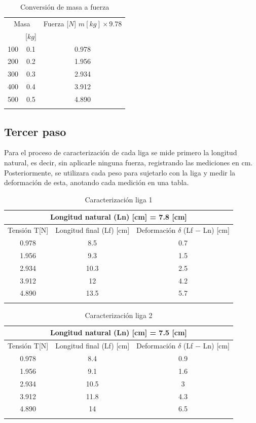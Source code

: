 \documentclass[12pt, titlepage]{report}
\begin{document}
    \begin{longtable}{|c|c|c|}
        \hline
        \multicolumn{2}{|c|}{Masa} & \multirowcell{2}{Fuerza [$N$] \\ $m[kg] \times 9.78 $} \\ \cline{1-2}
        [$g$] & [$kg$] & ~ \\ \hline
        100 & 0.1 & 0.978 \\ \hline
        200 & 0.2 & 1.956 \\ \hline
        300 & 0.3 & 2.934 \\ \hline
        400 & 0.4 & 3.912 \\ \hline
        500 & 0.5 & 4.890 \\ \hline
        \caption{Conversión de masa a fuerza}
    \end{longtable} 

    \subsection*{Tercer paso}
    Para el proceso de caracterización de cada liga se mide primero la longitud natural, es decir, sin aplicarle ninguna fuerza, registrando las mediciones en cm. Posteriormente, se utilizara cada peso para sujetarlo con la liga y medir la deformación de esta, anotando cada medición en una tabla.

    \begin{longtable}{|c|c|c|}
        \hline
        \multicolumn{3}{|c|}{Longitud natural (Ln) [cm] = 7.8 [cm]} \\ \hline
        Tensión T[N] & Longitud final (Lf) [cm] & Deformación $\delta$  (Lf $-$ Ln) [cm] \\ \hline
        0.978 & 8.5 & 0.7 \\ \hline
        1.956 & 9.3 & 1.5 \\ \hline
        2.934 & 10.3 & 2.5 \\ \hline
        3.912 & 12 & 4.2 \\ \hline
        4.890 & 13.5 & 5.7 \\ \hline
        \caption{Caracterización liga 1}
    \end{longtable}

    \begin{longtable}{|c|c|c|}
        \hline
        \multicolumn{3}{|c|}{Longitud natural (Ln) [cm] = 7.5 [cm]} \\ \hline
        Tensión T[N] & Longitud final (Lf) [cm] & Deformación $\delta$  (Lf $-$ Ln) [cm] \\ \hline
        0.978 & 8.4 & 0.9 \\ \hline
        1.956 & 9.1 & 1.6 \\ \hline
        2.934 & 10.5 & 3\\ \hline
        3.912 & 11.8 & 4.3 \\ \hline
        4.890 & 14 & 6.5 \\ \hline
        \caption{Caracterización liga 2}
    \end{longtable}
\end{document}
